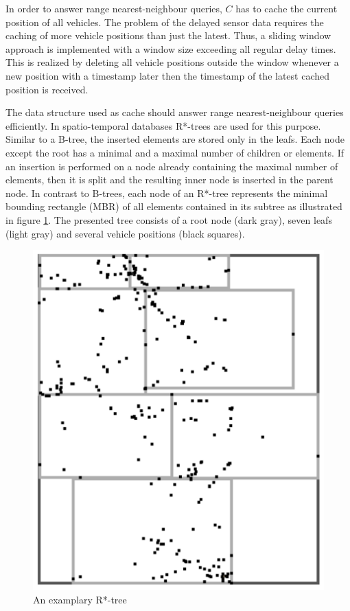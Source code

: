 In order to answer range nearest-neighbour queries, $C$ has to cache the current position of all vehicles. The problem of the delayed sensor data requires the caching of more vehicle positions than just the latest. Thus, a sliding window approach is implemented with a window size exceeding all regular delay times. This is realized by deleting all vehicle positions outside the window whenever a new position with a timestamp later then the timestamp of the latest cached position is received.

The data structure used as cache should answer range nearest-neighbour queries efficiently. In spatio-temporal databases R*-trees \cite{Beckmann1990TRA} are used for this purpose. Similar to a B-tree, the inserted elements are stored only in the leafs. Each node except the root has a minimal and a maximal number of children or elements. If an insertion is performed on a node already containing the maximal number of elements, then it is split and the resulting inner node is inserted in the parent node. In contrast to B-trees, each node of an R*-tree represents the minimal bounding rectangle (MBR) of all elements contained in its subtree as illustrated in figure \ref{fig:Rtree}. The presented tree consists of a root node (dark gray), seven leafs (light gray) and several vehicle positions (black squares).

\begin{figure}[htbp]
\centering
\includegraphics[scale=0.3,angle=90]{img/dgm/rTree.pdf}
\caption{An examplary R*-tree}\label{fig:Rtree}
\end{figure}

